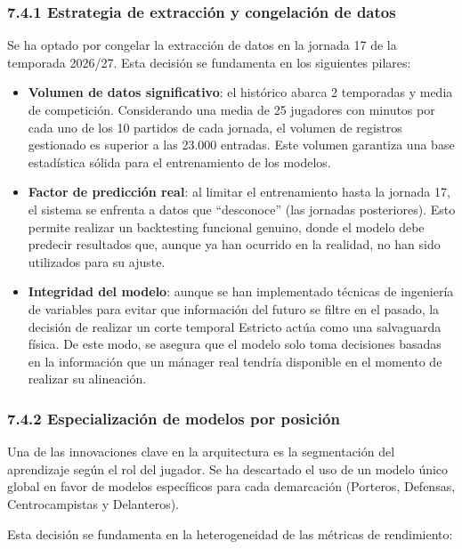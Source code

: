 \subsubsection{7.4.1 Estrategia de extracción y congelación de datos}

Se ha optado por congelar la extracción de datos en la jornada 17 de la
temporada 2026/27. Esta decisión se fundamenta en los siguientes pilares:

\begin{itemize}
\item \textbf{Volumen de datos significativo}: el histórico abarca 2 temporadas
y media de competición. Considerando una media de 25 jugadores con minutos por
cada uno de los 10 partidos de cada jornada, el volumen de registros gestionado
es superior a las 23.000 entradas. Este volumen garantiza una base estadística
sólida para el entrenamiento de los modelos.

\item \textbf{Factor de predicción real}: al limitar el entrenamiento hasta la
jornada 17, el sistema se enfrenta a datos que ``desconoce'' (las jornadas
posteriores). Esto permite realizar un backtesting funcional genuino, donde el
modelo debe predecir resultados que, aunque ya han ocurrido en la realidad, no
han sido utilizados para su ajuste.

\item \textbf{Integridad del modelo}: aunque se han
implementado técnicas de ingeniería de variables para evitar que información del
futuro se filtre en el pasado, la decisión de realizar un corte temporal
Estricto actúa como una salvaguarda física. De este modo, se asegura que el
modelo solo toma decisiones basadas en la información que un mánager real
tendría disponible en el momento de realizar su alineación.
\end{itemize}


\subsubsection{7.4.2 Especialización de modelos por posición}

Una de las innovaciones clave en la arquitectura es la segmentación del
aprendizaje según el rol del jugador. Se ha descartado el uso de un modelo único
global en favor de modelos específicos para cada demarcación (Porteros,
Defensas, Centrocampistas y Delanteros).

Esta decisión se fundamenta en la heterogeneidad de las métricas de rendimiento:

